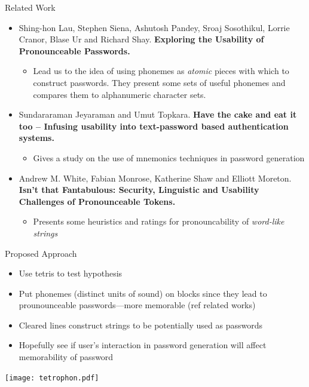 \documentclass[aspectratio=169]{beamer}
\begin{document}
\begin{frame}{Related Work}
	\begin{itemize}
		\item Shing-hon Lau, Stephen Siena, Ashutosh Pandey, Sroaj Sosothikul, Lorrie Cranor, Blase Ur and Richard Shay. \textbf{Exploring the Usability of Pronounceable Passwords.}

		\begin{itemize}
			\item 
		Lead us to the idea of using phonemes as \emph{atomic} pieces with which to construct passwords. They present some sets of useful phonemes and compares them to alphanumeric character sets. 
		\end{itemize}
		\item Sundararaman Jeyaraman and Umut Topkara. \textbf{Have the cake and eat it too -- Infusing usability into text-password based authentication systems.}

		\begin{itemize}
			\item 
		Gives a study on the use of mnemonics techniques in password generation
		\end{itemize}
		\item Andrew M. White, Fabian Monrose, Katherine Shaw and Elliott Moreton. \textbf{Isn’t that Fantabulous: Security, Linguistic and Usability Challenges of Pronounceable Tokens.}

		\begin{itemize}
			\item 
		Presents some heuristics and ratings for pronouncability of \emph{word-like strings}
		\end{itemize}
	\end{itemize}
\end{frame}
\begin{frame}{Proposed Approach}
	\begin{itemize}
		\item Use tetris to test hypothesis
		\item Put phonemes (distinct units of sound) on blocks since they lead to prounounceable passwords---more memorable (ref related works)
		\item Cleared lines construct strings to be potentially used as passwords
		\item Hopefully see if user's interaction in password generation will affect memorability of password
	\end{itemize}
	\centering
	\texttt{[image: tetrophon.pdf]}
\end{frame}
\end{document}

